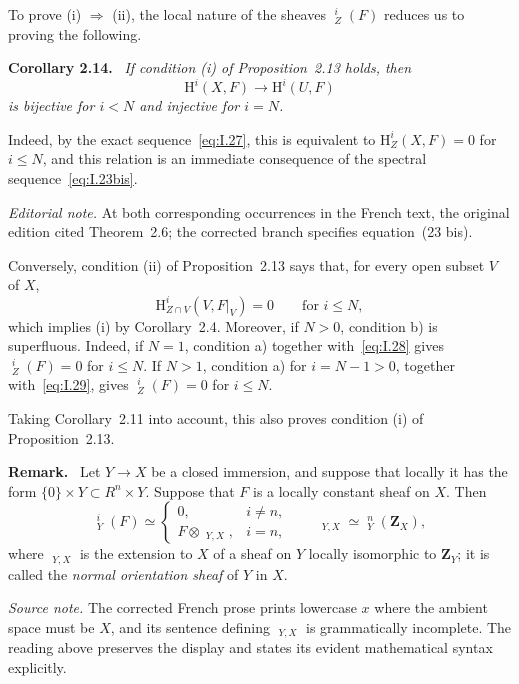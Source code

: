 \documentclass[11pt]{article}
\newcommand{\uH}{\mathop{\underline{\mathrm H}}\nolimits}
\newcommand{\uT}{\mathop{\underline{\mathrm T}}\nolimits}
\newcommand{\ZZ}{\mathbf{Z}}
\newcommand{\restr}[2]{#1\vert_{#2}}
\newcommand{\srcpage}[1]{%
  \marginpar{\raggedright\scriptsize\color{rulegray}French printed p.~#1}}
\newenvironment{sgastatement}[1]
  {\par\addvspace{0.8\baselineskip}\noindent\textbf{#1.}\ \itshape}
  {\par\addvspace{0.4\baselineskip}}
\newenvironment{sgaremark}[1]
  {\par\addvspace{0.8\baselineskip}\noindent\textbf{#1.}\ }
  {\par\addvspace{0.4\baselineskip}}
\begin{document}
To prove \textup{(i)} $\Rightarrow$ \textup{(ii)}, the local nature of the
sheaves $\uH_Z^i(F)$ reduces us to proving the following.

\begin{sgastatement}{Corollary 2.14}
If condition \textup{(i)} of Proposition~2.13 holds, then
\[
  \mathrm H^i(X,F)\longrightarrow\mathrm H^i(U,F)
\]
is bijective for $i<N$ and injective for $i=N$.
\end{sgastatement}

Indeed, by the exact sequence~\eqref{eq:I.27}, this is equivalent to
$\mathrm H_Z^i(X,F)=0$ for $i\le N$, and this\srcpage{18} relation is an
immediate consequence of the spectral sequence~\eqref{eq:I.23bis}.

\noindent\textit{Editorial note.} At both corresponding occurrences in the
French text, the original edition cited Theorem~2.6; the corrected branch
specifies equation~(23 bis).

Conversely, condition \textup{(ii)} of Proposition~2.13 says that, for every
open subset $V$ of $X$,
\[
  \mathrm H_{Z\cap V}^i(V,\restr{F}{V})=0
  \qquad\text{for }i\le N,
\]
which implies \textup{(i)} by Corollary~2.4. Moreover, if $N>0$, condition
\textup{b)} is superfluous. Indeed, if $N=1$, condition \textup{a)} together
with~\eqref{eq:I.28} gives $\uH_Z^i(F)=0$ for $i\le N$. If $N>1$,
condition \textup{a)} for $i=N-1>0$, together with~\eqref{eq:I.29}, gives
$\uH_Z^i(F)=0$ for $i\le N$.

Taking Corollary~2.11 into account, this also proves condition \textup{(i)}
of Proposition~2.13.

\begin{sgaremark}{Remark}
Let $Y\to X$ be a closed immersion, and suppose that locally it has the form
$\{0\}\times Y\subset R^n\times Y$. Suppose that $F$ is a locally constant
sheaf on $X$. Then
\begin{equation}
  \uH_Y^i(F)\simeq
  \begin{cases}
    0,& i\ne n,\\
    F\otimes\uT_{Y,X},& i=n,
  \end{cases}
  \qquad
  \uT_{Y,X}\simeq\uH_Y^n(\ZZ_X),
  \tag{30}\label{eq:I.30}
\end{equation}
where $\uT_{Y,X}$ is the extension to $X$ of a sheaf on $Y$ locally
isomorphic to $\ZZ_Y$; it is called the \emph{normal orientation sheaf} of
$Y$ in $X$.
\end{sgaremark}

\noindent\textit{Source note.} The corrected French prose prints lowercase
$x$ where the ambient space must be $X$, and its sentence defining
$\uT_{Y,X}$ is grammatically incomplete. The reading above preserves the
display and states its evident mathematical syntax explicitly.
\end{document}
